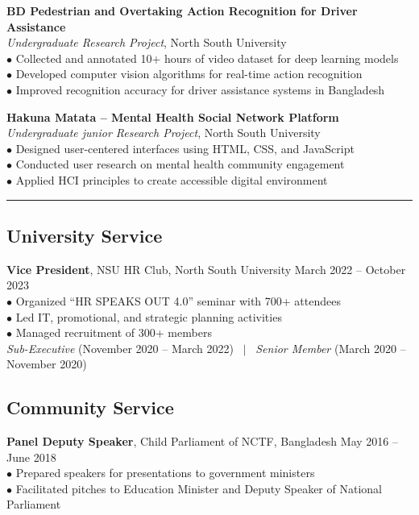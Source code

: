 \documentclass[11pt,a4paper]{article}
\renewcommand{\section}[1]{%
    \par\vspace{10pt}%
    \pagebreak[0]%
    \noindent{\large\bfseries\scshape #1}%
    \vspace{2pt}%
    \hrule%
    \vspace{6pt}%
    \nopagebreak[4]%
}
\begin{document}
\vspace{6pt}
\noindent\textbf{BD Pedestrian and Overtaking Action Recognition for Driver Assistance}\\
\textit{Undergraduate Research Project}, North South University\\
$\bullet$ Collected and annotated 10+ hours of video dataset for deep learning models\\
$\bullet$ Developed computer vision algorithms for real-time action recognition\\
$\bullet$ Improved recognition accuracy for driver assistance systems in Bangladesh

\vspace{6pt}
\noindent\textbf{Hakuna Matata -- Mental Health Social Network Platform}\\
\textit{Undergraduate junior Research Project}, North South University\\
$\bullet$ Designed user-centered interfaces using HTML, CSS, and JavaScript\\
$\bullet$ Conducted user research on mental health community engagement\\
$\bullet$ Applied HCI principles to create accessible digital environment

\section{Service}

\subsection*{University Service}
\noindent\textbf{Vice President}, NSU HR Club, North South University \hfill March 2022 -- October 2023\\
$\bullet$ Organized ``HR SPEAKS OUT 4.0'' seminar with 700+ attendees\\
$\bullet$ Led IT, promotional, and strategic planning activities\\
$\bullet$ Managed recruitment of 300+ members\\
\textit{Sub-Executive} (November 2020 -- March 2022) ~$|$~ \textit{Senior Member} (March 2020 -- November 2020)

\subsection*{Community Service}
\noindent\textbf{Panel Deputy Speaker}, Child Parliament of NCTF, Bangladesh \hfill May 2016 -- June 2018\\
$\bullet$ Prepared speakers for presentations to government ministers\\
$\bullet$ Facilitated pitches to Education Minister and Deputy Speaker of National Parliament
\end{document}

